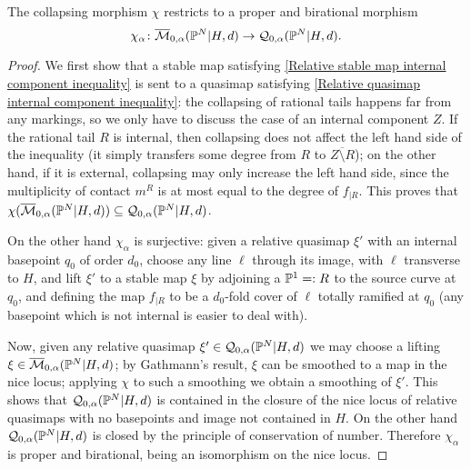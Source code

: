 \begin{lem}
 The collapsing morphism $\chi$ restricts to a proper and birational morphism \[\chi_\alpha\colon \overline{\mathcal{M}}_{0,\alpha}(\mathbb P^N|H,d)\rightarrow \mathcal{Q}_{0,\alpha}(\mathbb P^N|H,d).\]
\end{lem}
\begin{proof}
 We first show that a stable map satisfying \eqref{Relative stable map internal component inequality} is sent to a quasimap satisfying \eqref{Relative quasimap internal component inequality}: the collapsing of rational tails happens far from any markings, so we only have to discuss the case of an internal component $Z$. If the rational tail $R$ is internal, then collapsing does not affect the left hand side of the inequality (it simply transfers some degree from $R$ to $\overline{Z\setminus R}$); on the other hand, if it is external, collapsing may only increase the left hand side, since the multiplicity of contact $m^R$ is at most equal to the degree of $f_{|R}$. This proves that $\chi(\overline{\mathcal{M}}_{0,\alpha}(\mathbb P^N|H,d))\subseteq \mathcal{Q}_{0,\alpha}(\mathbb P^N|H,d)$.
 
 On the other hand $\chi_\alpha$ is surjective: given a relative quasimap $\xi'$ with an internal basepoint $q_0$ of order $d_0$, choose any line $\ell$ through its image, with $\ell$ transverse to $H$, and lift $\xi'$ to a stable map $\xi$ by adjoining a $\mathbb P^1=:R$ to the source curve at $q_0$, and defining the map $f_{|R}$ to be a $d_0$-fold cover of $\ell$ totally ramified at $q_0$ (any basepoint which is not internal is easier to deal with).
 
 Now, given any relative quasimap $\xi'\in\mathcal{Q}_{0,\alpha}(\mathbb P^N|H,d)$ we may choose a lifting $\xi\in\overline{\mathcal{M}}_{0,\alpha}(\mathbb P^N|H,d)$; by Gathmann's result, $\xi$ can be smoothed to a map in the nice locus; applying $\chi$ to such a smoothing we obtain a smoothing of $\xi'$. This shows that $\mathcal{Q}_{0,\alpha}(\mathbb P^N|H,d)$ is contained in the closure of the nice locus of relative quasimaps with no basepoints and image not contained in $H$. On the other hand $\mathcal{Q}_{0,\alpha}(\mathbb P^N|H,d)$ is closed by the principle of conservation of number. Therefore $\chi_\alpha$ is proper and birational, being an isomorphism on the nice locus.
\end{proof}

